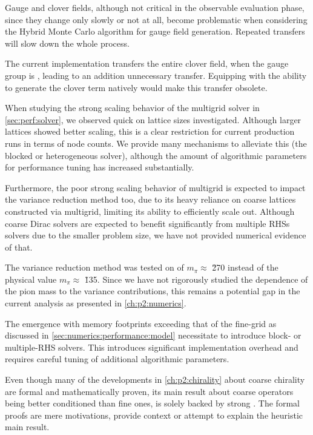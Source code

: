 Gauge and clover fields, although not critical in the observable evaluation phase, since they change only slowly or not at all, become problematic when considering the Hybrid Monte Carlo algorithm for gauge field generation.
Repeated transfers will slow down the whole process.

The current implementation transfers the entire clover field, when the gauge group is , leading to an addition unnecessary transfer.
Equipping \quda with the ability to generate the  clover term natively would make this transfer obsolete.

When studying the strong scaling behavior of the multigrid solver in \cref{sec:perf:solver}, we observed quick  on lattice sizes investigated.
Although larger lattices showed better scaling, this is a clear restriction for current production runs in terms of node counts.
We provide many mechanisms to alleviate this (the blocked or heterogeneous solver), although the amount of algorithmic parameters for performance tuning has increased substantially.

Furthermore, the poor strong scaling behavior of multigrid is expected to impact the variance reduction method too, due to its heavy reliance on coarse lattices constructed via multigrid, limiting its ability to efficiently scale out.
Although coarse Dirac solvers are expected to benefit significantly from multiple RHSs solvers due to the smaller problem size, we have not provided numerical evidence of that.

The variance reduction method was tested on  of $m_{\pi} \approx $ \u{270}{\MeV} instead of the physical value $m_{\pi} \approx $ \u{135}{\MeV}.
Since we have not rigorously studied the dependence of the pion mass
to the variance contributions,
this remains a potential gap in the current analysis as presented in \cref{ch:p2:numerics}.

The emergence  with memory footprints exceeding that of the fine-grid as discussed in \cref{sec:numerics:performance:model} necessitate to introduce block- or multiple-RHS solvers.
This introduces significant implementation overhead and requires careful tuning of additional algorithmic parameters.

Even though many of the developments in \cref{ch:p2:chirality} about coarse chirality are formal and mathematically proven, its main result about coarse operators being better conditioned than fine ones, is solely backed by strong .
The formal proofs are mere motivations, provide context or attempt to explain the heuristic main result.

